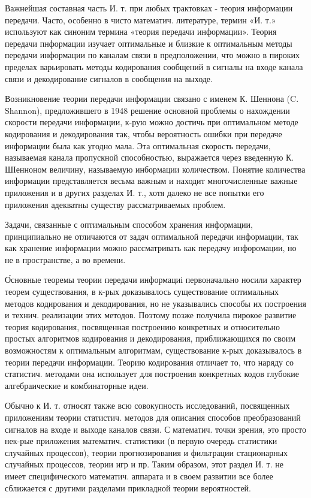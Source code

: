 \documentclass[10pt]{article}
\begin{document}
Важнейшая составная часть И. т. при любых трактовках - теория информации передачи. Часто, особенно в чисто математич. литературе, термин «И. т.» используют как синоним термина «теория передачи информации». Теория передачи пнформации изучает оптимальные и близкие к оптимальным методы передачи информации по каналам связи в предположении, что можно в пироких пределах варьировать методы кодирования сообщений в сигналы на входе канала связи и декодирование сигналов в сообщения на выходе.



Возникновение теории передачи информации связано с именем К. Шеннона (C. Shannon), предложившего в 1948 решение основной проблемы о нахождении скорости передачи информации, к-рую можно достичь при оптимальном методе кодирования и декодирования так, чтобы вероятность ошибки при передаче информации была как угодно мала. Эта оптимальная скорость передачи, называемая канала пропускной способностью, выражается через введенную К. ШІенноном величину, называемую инбормации количеством. Понятие количества информации представляется весьма важным и находит многочисленные важные приложения и в других разделах И. т., хотя далеко не все попытки его приложения адекватны существу рассматриваемых проблем.



Задачи, связанные с оптимальным способом хранения информации, принципиально не отличаются от задач оптимальной передачи информации, так как хранение информации можно рассматривать как передачу инфоромации, но не в пространстве, а во времени.



О́сновные теоремы теории передачи информациі первоначально носили характер теорем существования, в к-рых доказывалось существование оптимальных методов кодирования и декодирования, но не указывались способы их построения и технич. реализации этих методов. Поэтому позже получила пирокое развитие теория кодирования, посвященная построению конкретных и относительно простых алгоритмов кодирования и декодирования, приближающихся по своим возможностям к оптимальным алгоритмам, существование к-рых доказывалось в теории передачи информации. Теорию кодирования отличает то, что наряду со статистич. методами она использует для построения конкретных кодов глубокие алгебраические и комбинаторные идеи.



Обычно к И. т. относят также всю совокупность исследований, посвященных приложениям теории статистич. методов для описания способов преобразований сигналов на входе и выходе каналов связи. С математич. точки зрения, это просто нек-рые приложения математич. статистики (в первую очередь статистики случайных процессов), теории прогнозирования и фильтрации стационарных случайных процессов, теории игр и пр. Таким образом, этот раздел И. т. не имеет специфического математич. аппарата и в своем развитии все более сближается с другими разделами прикладной теории вероятностей.
\end{document}
